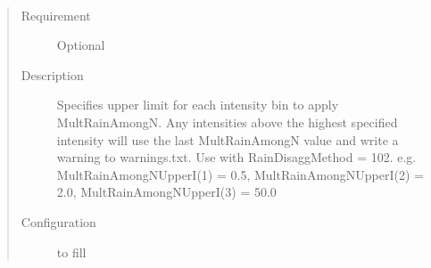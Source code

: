 \documentclass[letterpaper,10pt,english]{sphinxmanual}
\begin{document}

\begin{fulllineitems}
\label{\detokenize{input_files/RunControl/Options_related_to_disaggregation_of_input_data:cmdoption-arg-multrainamongnupperi}}~\begin{quote}\begin{description}
\item[{Requirement}] \leavevmode
Optional

\item[{Description}] \leavevmode
Specifies upper limit for each intensity bin to apply MultRainAmongN. Any intensities above the highest specified intensity will use the last MultRainAmongN value and write a warning to warnings.txt. Use with RainDisaggMethod = 102. e.g. MultRainAmongNUpperI(1) = 0.5, MultRainAmongNUpperI(2) = 2.0, MultRainAmongNUpperI(3) = 50.0

\item[{Configuration}] \leavevmode
to fill

\end{description}\end{quote}

\end{fulllineitems}

\end{document}
